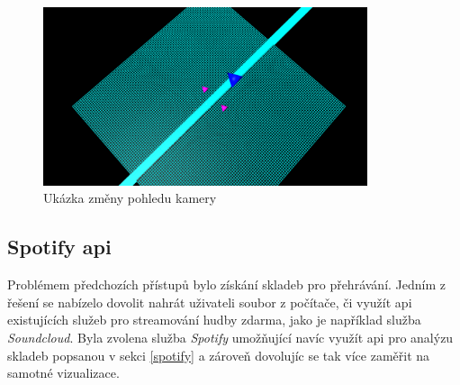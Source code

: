 \documentclass[thesis=B, czech]{FITthesis}[2019/03/06]
\makeatletter
\newenvironment{verze}[6]{ 
    \begin{table}[] 
    \begin{tabular}[t]{@{}ll@{}} 
    \toprule
      \multicolumn{2}{c}{#1}  \\ \midrule
    \multicolumn{2}{c}{          \ \ \ \ \ \ \ \
    \texttt{[image: \#5]}         \ \ \  \ \ \ \ \ 
    }         \\
    verze:            & #2      \\
    technologie:      & #3     \\
    parametry:         & \begin{tabular}[c]{@{}l@{}}#4\end{tabular}       \\ [15pt]
    krátký popis:         & \begin{tabular}[c]{@{}l@{}} #6 \end{tabular}       \\\bottomrule
    \end{tabular}
    \end{table}
    }
\makeatother
\begin{document}
\begin{figure}
  \centering
  \includegraphics[width=0.85\textwidth]{images/previous_versions/fraviz055.png}
  \caption{Ukázka změny pohledu kamery}
  \label{fig:cameraPerspective}
\end{figure}

\subsection*{Spotify \gls{api}}

Problémem předchozích přístupů bylo získání skladeb pro přehrávání. Jedním z řešení se nabízelo dovolit nahrát uživateli soubor z počítače, či využít \gls{api} existujících služeb pro streamování hudby zdarma, jako je například služba \textit{Soundcloud}. Byla zvolena služba \textit{Spotify} umožňující navíc využít \gls{api} pro analýzu skladeb popsanou v sekci \ref{spotify} a zároveň dovolujíc se tak více zaměřit na samotné vizualizace. 

\end{document}

